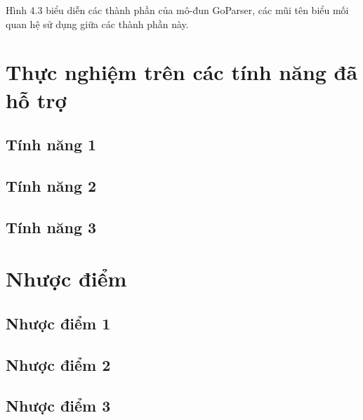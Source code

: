Hình 4.3 biểu diễn các thành phần của mô-đun GoParser, các mũi tên biểu mối
quan hệ sử dụng giữa các thành phần này.

\section{Thực nghiệm trên các tính năng đã hỗ trợ}

\subsection{Tính năng 1}

\subsection{Tính năng 2}

\subsection{Tính năng 3}

\section{Nhược điểm}

\subsection{Nhược điểm 1}

\subsection{Nhược điểm 2}

\subsection{Nhược điểm 3}